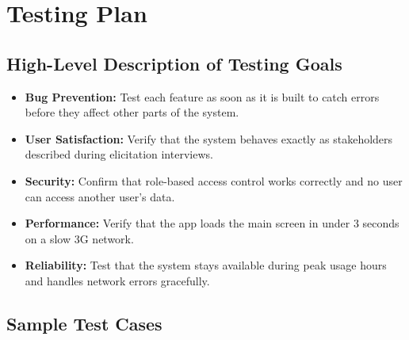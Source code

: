 \documentclass[12pt,a4paper]{article}
\begin{document}
\newpage
\section{Testing Plan}

\subsection{High-Level Description of Testing Goals}

\begin{itemize}[leftmargin=*, label=\textbullet, itemsep=4pt]
  \item \textbf{Bug Prevention:} Test each feature as soon as it is built to catch errors before they affect other parts of the system.
  \item \textbf{User Satisfaction:} Verify that the system behaves exactly as stakeholders described during elicitation interviews.
  \item \textbf{Security:} Confirm that role-based access control works correctly and no user can access another user's data.
  \item \textbf{Performance:} Verify that the app loads the main screen in under 3 seconds on a slow 3G network.
  \item \textbf{Reliability:} Test that the system stays available during peak usage hours and handles network errors gracefully.
\end{itemize}

\subsection{Sample Test Cases}
\end{document}
